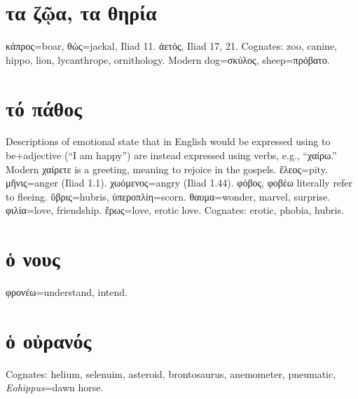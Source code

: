 \documentclass[12pt,openany]{book}
\newenvironment{notes}{\vfill\scriptsize\begin{flushright}}{\end{flushright}}
\newcommand{\fig}[1]{\begin{center}\end{center}}
\begin{document}

\chapter{τα ζῷα, τα θηρία}

\fig{animals/animals.svg} %

\begin{notes}
κάπρος=boar,  θώς=jackal, Iliad 11.  ἀετός, Iliad 17, 21. Cognates: zoo, canine, hippo, lion, lycanthrope, ornithology.
Modern dog=σκύλος, sheep=πρόβατο. 
\end{notes}


\chapter{τό πάθος}

\fig{emotions/emotions.svg}

\begin{notes}
Descriptions of emotional state that in English would be expressed using to be+adjective (``I am happy'') are
instead expressed using verbs, e.g., ``χαίρω.''
Modern χαίρετε is a greeting, meaning to rejoice in the gospels.
ἕλεος=pity. μῆνις=anger (Iliad 1.1). χωόμενος=angry (Iliad 1.44).
φόβος, φοβέω literally refer to fleeing. ὕβρις=hubris, ὑπεροπλίη=scorn.
θαυμα=wonder, marvel, surprise. φιλία=love, friendship. ἕρως=love, erotic love.
Cognates: erotic, phobia, hubris.
\end{notes}


\chapter{ὁ νους}

\fig{mind/mind.svg}

\begin{notes}
φρονέω=understand, intend.
\end{notes}


\chapter{ὁ οὐρανός}

\fig{sky/sky.svg}

\begin{notes}
Cognates: helium, selenuim, asteroid, brontosaurus, anemometer, pneumatic, \emph{Eohippus}=dawn horse.
\end{notes}
\end{document}
